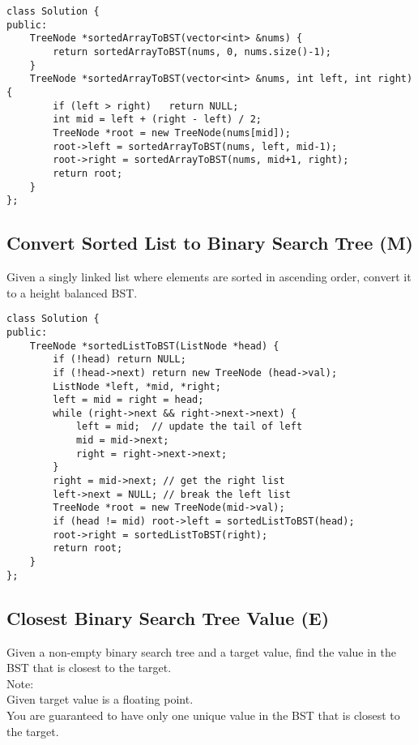 \begin{lstlisting}
class Solution {
public:
    TreeNode *sortedArrayToBST(vector<int> &nums) {
        return sortedArrayToBST(nums, 0, nums.size()-1);
    }
    TreeNode *sortedArrayToBST(vector<int> &nums, int left, int right) {
        if (left > right)   return NULL;
        int mid = left + (right - left) / 2;
        TreeNode *root = new TreeNode(nums[mid]);
        root->left = sortedArrayToBST(nums, left, mid-1);
        root->right = sortedArrayToBST(nums, mid+1, right);
        return root;
    }
};
\end{lstlisting}


\subsection{Convert Sorted List to Binary Search Tree (M)}
Given a singly linked list where elements are sorted in ascending order, convert it to a height balanced BST.\\

\begin{lstlisting}
class Solution {
public:
    TreeNode *sortedListToBST(ListNode *head) {
        if (!head) return NULL;
        if (!head->next) return new TreeNode (head->val);
        ListNode *left, *mid, *right;
        left = mid = right = head;
        while (right->next && right->next->next) {
            left = mid;  // update the tail of left
            mid = mid->next;
            right = right->next->next;
        }
        right = mid->next; // get the right list
        left->next = NULL; // break the left list
        TreeNode *root = new TreeNode(mid->val);
        if (head != mid) root->left = sortedListToBST(head);
        root->right = sortedListToBST(right);
        return root;
    }
};
\end{lstlisting}


\subsection{Closest Binary Search Tree Value (E)}
Given a non-empty binary search tree and a target value, find the value in the BST that is closest to the target.\\

Note:\\
    Given target value is a floating point.\\
    You are guaranteed to have only one unique value in the BST that is closest to the target.\\

